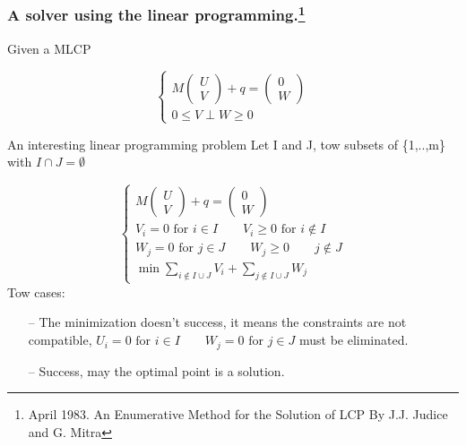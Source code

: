 
\frame
{
\frametitle{A solver using the linear programming.\footnote{April 1983. An Enumerative Method for the Solution
of LCP By J.J. Judice and G. Mitra}}
\begin{block}{ Given a MLCP}
 

\begin{equation}\label{eq:mlcp1}
 \begin{cases}
M \left(\begin{array}{c}
   U\\
   V
   \end{array}\right) + q = \left(\begin{array}{c}
   0\\
   W
   \end{array}\right) \\
      0 \le V \perp     W   \ge 0

      \end{cases}
\end{equation}


\end{block}

\begin{block}{An interesting linear programming problem}
Let I and J, tow subsets of \{1,..,m\} with  $I \cap J = \emptyset$

\begin{equation}\label{eq:mlcp1}
\begin{cases}
M \left(\begin{array}{c}
   U\\
   V
   \end{array}\right) + q = \left(\begin{array}{c}
   0\\
   W
   \end{array}\right)\\
V_i = 0 \textrm{ for } i \in I \qquad V_i \ge 0 \textrm{ for } i \notin I\\
W_j = 0 \textrm{ for } j \in J \qquad W_j \ge 0 \qquad j \notin J\\
\min{\sum_{i\notin I\cup J} V_i + \sum_{j\notin I\cup J} W_j}
\end{cases}
\end{equation}
Tow cases:\\
\begin{itemize}
 \item[--] The minimization doesn't success, it means the constraints are not compatible, $U_i =0 \textrm{ for } i \in I \qquad W_j=0 \textrm{ for } j\in J$ must be eliminated.\\
\item[--]Success, may the optimal point is a solution.
\end{itemize}

\end{block}

}

